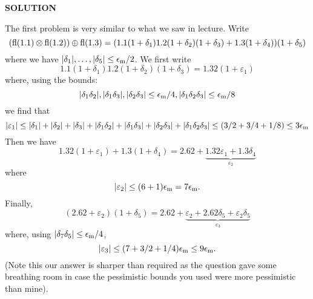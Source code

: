 \documentclass[12pt,a4paper]{article}
\begin{document}
\textbf{SOLUTION}

The first problem is very similar to what we saw in lecture. Write
\[
({\rm fl}(1.1)\ensuremath{\otimes} {\rm fl}(1.2)) \ensuremath{\oplus} {\rm fl}(1.3) = ( 1.1(1 + \ensuremath{\delta}_1)1.2(1+\ensuremath{\delta}_2)(1+\ensuremath{\delta}_3) + 1.3(1+\ensuremath{\delta}_4))(1+\ensuremath{\delta}_5)
\]
where we have $|\ensuremath{\delta}_1|,\ensuremath{\ldots},|\ensuremath{\delta}_5| \ensuremath{\leq} \ensuremath{\epsilon}_{\rm m}/2$. We first write
\[
1.1(1 + \ensuremath{\delta}_1)1.2(1+\ensuremath{\delta}_2)(1+\ensuremath{\delta}_3) = 1.32( 1+ \ensuremath{\varepsilon}_1)
\]
where, using the bounds:
\[
|\ensuremath{\delta}_1\ensuremath{\delta}_2|,|\ensuremath{\delta}_1\ensuremath{\delta}_3|,|\ensuremath{\delta}_2\ensuremath{\delta}_3| \ensuremath{\leq} \ensuremath{\epsilon}_{\rm m}/4, |\ensuremath{\delta}_1\ensuremath{\delta}_2\ensuremath{\delta}_3| \ensuremath{\leq} \ensuremath{\epsilon}_{\rm m}/8
\]
we find that
\[
|\ensuremath{\varepsilon}_1| \ensuremath{\leq} |\ensuremath{\delta}_1| + |\ensuremath{\delta}_2| + |\ensuremath{\delta}_3| + |\ensuremath{\delta}_1\ensuremath{\delta}_2| + |\ensuremath{\delta}_1\ensuremath{\delta}_3| + |\ensuremath{\delta}_2\ensuremath{\delta}_3|+ |\ensuremath{\delta}_1\ensuremath{\delta}_2\ensuremath{\delta}_3| 
     \ensuremath{\leq} (3/2 + 3/4 + 1/8) \ensuremath{\leq} 3 \ensuremath{\epsilon}_{\rm m}
\]
Then we have
\[
1.32 (1 + \ensuremath{\varepsilon}_1) + 1.3 (1 + \ensuremath{\delta}_4) = 2.62 + \underbrace{1.32 \ensuremath{\varepsilon}_1 + 1.3\ensuremath{\delta}_4}_{\ensuremath{\varepsilon}_2}
\]
where
\[
|\ensuremath{\varepsilon}_2| \ensuremath{\leq} (6 + 1) \ensuremath{\epsilon}_{\rm m} = 7 \ensuremath{\epsilon}_{\rm m}.
\]
Finally,
\[
(2.62 + \ensuremath{\varepsilon}_2)(1+\ensuremath{\delta}_5) = 2.62 + \underbrace{\ensuremath{\varepsilon}_2 + 2.62\ensuremath{\delta}_5 + \ensuremath{\varepsilon}_2 \ensuremath{\delta}_5}_{\ensuremath{\varepsilon}_3}
\]
where, using $|\ensuremath{\delta}_7 \ensuremath{\delta}_5| \ensuremath{\leq} \ensuremath{\epsilon}_{\rm m}/4$, 
\[
|\ensuremath{\varepsilon}_3| \ensuremath{\leq} (7 + 3/2 + 1/4) \ensuremath{\epsilon}_{\rm m}  \ensuremath{\leq} 9 \ensuremath{\epsilon}_{\rm m}.
\]
(Note this our answer is sharper than required as the question gave some breathing room in case the pessimistic bounds you used were more pessimistic than mine).
\end{document}
